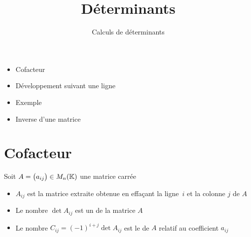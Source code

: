 

   





\title{{\bf Déterminants}}
\subtitle{Calculs de déterminants}

\begin{frame}
  
  \debutmontitre

  \pause

{\footnotesize
\hfill
{}
\begin{minipage}{0.6\textwidth}
  \begin{itemize}
    \item<3-> Cofacteur
    \item<4-> Développement suivant une ligne
    \item<5-> Exemple
    \item<6-> Inverse d'une matrice
  \end{itemize}
\end{minipage}
}

\end{frame}

\setcounter{framenumber}{0}


\section{Cofacteur}

\begin{frame}
\begin{mydefinition}

Soit $A = \big( a_{ij}\big) \in M_n(\mathbb{K})$ une matrice carrée
 
\begin{itemize}
  \item\pause $A_{ij}$ est la matrice extraite obtenue en effaçant la ligne~$i$ et la colonne $j$ de $A$
  \item\pause Le nombre $\det A_{ij}$ est un  de la matrice $A$
  \item\pause Le nombre $C_{ij} = (-1)^{i+j}\det A_{ij}$ est le  de $A$ 
  relatif au coefficient $a_{ij}$
\end{itemize}
\end{mydefinition}

\end{frame}


